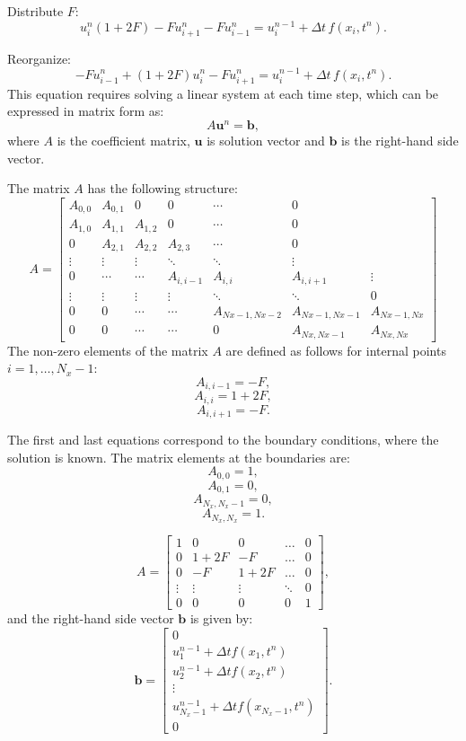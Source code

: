 \documentclass{article}
\begin{document}
			Distribute \( F \):
			\[
			u_i^n (1 + 2F) - F u_{i+1}^n - F u_{i-1}^n = u_i^{n-1} + \Delta t \, f(x_i, t^n).
			\]
			
			Reorganize:
			\[
			-F u_{i-1}^n + (1 + 2F) u_i^n - F u_{i+1}^n = u_i^{n-1} + \Delta t \, f(x_i, t^n).
			\]
			This equation requires solving a linear system at each time step, which can be expressed in matrix form as:
			\[
			A \mathbf{u}^n = \mathbf{b},
			\]
			where \( A \) is the coefficient matrix, \( \mathbf{u} \) is solution vector  and \( \mathbf{b} \) is the right-hand side vector.
			
			The matrix \( A \) has the following structure:
			\[
			A = 
			\begin{bmatrix}
				A_{0,0} & A_{0,1} & 0 & 0 & \cdots & 0 \\
				A_{1,0} & A_{1,1} & A_{1,2} & 0 & \cdots & 0 \\
				0 & A_{2,1} & A_{2,2} & A_{2,3} & \cdots & 0 \\
				\vdots & \vdots & \vdots & \ddots & \ddots & \vdots \\
				0 & \cdots & \cdots & A_{i,i-1} & A_{i,i} & A_{i,i+1} & \vdots \\
				\vdots & \vdots & \vdots & \vdots & \ddots & \ddots & 0 \\
				0 & 0 & \cdots & \cdots & A_{Nx-1,Nx-2} & A_{Nx-1,Nx-1} &  A_{Nx-1,Nx} \\
				0 & 0 & \cdots & \cdots & 0 & A_{Nx,Nx-1} & A_{Nx,Nx}
			\end{bmatrix}
			\]
			The non-zero elements of the matrix \( A \) are defined as follows for internal points \( i = 1, \dots, N_x - 1 \):
			\[
			A_{i,i-1} = -F,
			\]
			\[
			A_{i,i} = 1 + 2F, 
			\]
			\[
			A_{i,i+1} = -F.
			\]
			
			The first and last equations correspond to the boundary conditions, where the solution is known. The matrix elements at the boundaries are:
			\[
			A_{0,0} = 1,
			\]
			\[
			A_{0,1} = 0,
			\]
			\[
			A_{N_x,N_x-1} = 0, 
			\]
			\[
			A_{N_x,N_x} = 1. 
			\]
			
		
			\[
			A = 
			\begin{bmatrix}
				1 & 0 & 0 & \dots & 0 \\
				0 & 1 + 2F & -F & \dots & 0 \\
				0 & -F & 1 + 2F & \dots & 0 \\
				\vdots & \vdots & \vdots & \ddots & 0 \\
				0 & 0 & 0 & 0 & 1
			\end{bmatrix},
			\]
			and the right-hand side vector \( \mathbf{b} \) is given by:
			\[
			\mathbf{b} =
			\begin{bmatrix}
				0 \\
				u_1^{n-1} + \Delta t f(x_1, t^n) \\
				u_2^{n-1} + \Delta t f(x_2, t^n) \\
				\vdots \\
				u_{N_x-1}^{n-1} + \Delta t f(x_{N_x-1}, t^n) \\
				0
			\end{bmatrix}.
			\]
			
\end{document}
